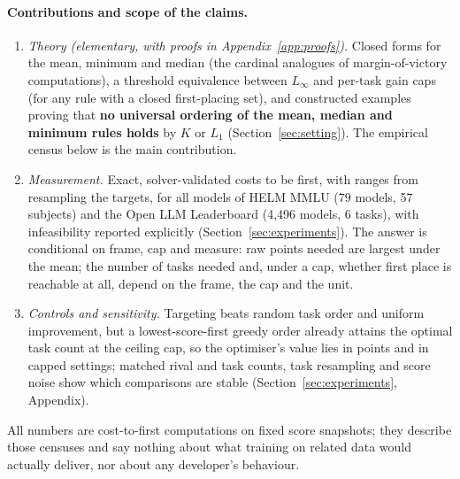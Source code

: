 \paragraph{Contributions and scope of the claims.}
\begin{enumerate}\setlength\itemsep{0pt}
\item \emph{Theory (elementary, with proofs in Appendix~\ref{app:proofs}).} Closed forms for the mean, minimum and median (the cardinal analogues of margin-of-victory computations), a threshold equivalence between $L_\infty$ and per-task gain caps (for any rule with a closed first-placing set), and constructed examples proving that \textbf{no universal ordering of the mean, median and minimum rules holds} by $K$ or $L_1$ (Section~\ref{sec:setting}). The empirical census below is the main contribution.
\item \emph{Measurement.} Exact, solver-validated costs to be first, with ranges from resampling the targets, for all models of HELM MMLU (79 models, 57 subjects) and the Open LLM Leaderboard (4{,}496 models, 6 tasks), with infeasibility reported explicitly (Section~\ref{sec:experiments}). The answer is conditional on frame, cap and measure: raw points needed are largest under the mean; the number of tasks needed and, under a cap, whether first place is reachable at all, depend on the frame, the cap and the unit.
\item \emph{Controls and sensitivity.} Targeting beats random task order and uniform improvement, but a lowest-score-first greedy order already attains the optimal task count at the ceiling cap, so the optimiser's value lies in points and in capped settings; matched rival and task counts, task resampling and score noise show which comparisons are stable (Section~\ref{sec:experiments}, Appendix).
\end{enumerate}
All numbers are cost-to-first computations on fixed score snapshots; they describe those censuses and say nothing about what training on related data would actually deliver, nor about any developer's behaviour.
